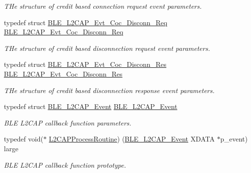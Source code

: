 \begin{DoxyCompactItemize}
\begin{DoxyCompactList}\small\item\em T\+He structure of credit based connection request event parameters. \end{DoxyCompactList}\item 
typedef struct \hyperlink{struct_b_l_e___l2_c_a_p___evt___coc___disconn___req}{B\+L\+E\+\_\+\+L2\+C\+A\+P\+\_\+\+Evt\+\_\+\+Coc\+\_\+\+Disconn\+\_\+\+Req} \hyperlink{group___b_l_e___l2_c_a_p_ga2a6ff5051a19f1de1242d0b2263eb6ae}{B\+L\+E\+\_\+\+L2\+C\+A\+P\+\_\+\+Evt\+\_\+\+Coc\+\_\+\+Disconn\+\_\+\+Req}\hypertarget{group___b_l_e___l2_c_a_p_ga2a6ff5051a19f1de1242d0b2263eb6ae}{}\label{group___b_l_e___l2_c_a_p_ga2a6ff5051a19f1de1242d0b2263eb6ae}

\begin{DoxyCompactList}\small\item\em T\+He structure of credit based disconnection request event parameters. \end{DoxyCompactList}\item 
typedef struct \hyperlink{struct_b_l_e___l2_c_a_p___evt___coc___disconn___res}{B\+L\+E\+\_\+\+L2\+C\+A\+P\+\_\+\+Evt\+\_\+\+Coc\+\_\+\+Disconn\+\_\+\+Res} \hyperlink{group___b_l_e___l2_c_a_p_gab2ca4ab41635028d7c60a05b7a77ecc4}{B\+L\+E\+\_\+\+L2\+C\+A\+P\+\_\+\+Evt\+\_\+\+Coc\+\_\+\+Disconn\+\_\+\+Res}\hypertarget{group___b_l_e___l2_c_a_p_gab2ca4ab41635028d7c60a05b7a77ecc4}{}\label{group___b_l_e___l2_c_a_p_gab2ca4ab41635028d7c60a05b7a77ecc4}

\begin{DoxyCompactList}\small\item\em T\+He structure of credit based disconnection response event parameters. \end{DoxyCompactList}\item 
typedef struct \hyperlink{struct_b_l_e___l2_c_a_p___event}{B\+L\+E\+\_\+\+L2\+C\+A\+P\+\_\+\+Event} \hyperlink{group___b_l_e___l2_c_a_p_gaab2b0b4b3db73c41e0704de1a3ec9295}{B\+L\+E\+\_\+\+L2\+C\+A\+P\+\_\+\+Event}\hypertarget{group___b_l_e___l2_c_a_p_gaab2b0b4b3db73c41e0704de1a3ec9295}{}\label{group___b_l_e___l2_c_a_p_gaab2b0b4b3db73c41e0704de1a3ec9295}

\begin{DoxyCompactList}\small\item\em B\+LE L2\+C\+AP callback function parameters. \end{DoxyCompactList}\item 
typedef void($\ast$ \hyperlink{group___b_l_e___l2_c_a_p_ga44ae8ada620cff0635a1173bcb4df6a5}{L2\+C\+A\+P\+Process\+Routine}) (\hyperlink{struct_b_l_e___l2_c_a_p___event}{B\+L\+E\+\_\+\+L2\+C\+A\+P\+\_\+\+Event} X\+D\+A\+TA $\ast$p\+\_\+event) large\hypertarget{group___b_l_e___l2_c_a_p_ga44ae8ada620cff0635a1173bcb4df6a5}{}\label{group___b_l_e___l2_c_a_p_ga44ae8ada620cff0635a1173bcb4df6a5}

\begin{DoxyCompactList}\small\item\em B\+LE L2\+C\+AP callback function prototype. \end{DoxyCompactList}\end{DoxyCompactItemize}
